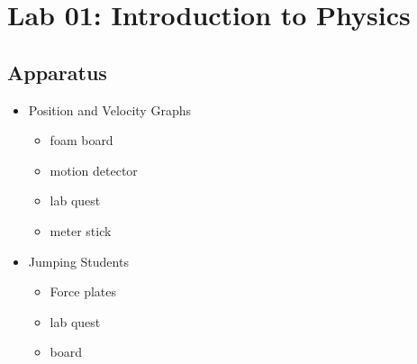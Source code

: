 

\usepackage{graphicx}
\graphicspath{ {./lab0images/} }


\renewcommand\assignment{Lab 0: Introduction to Physics, 1/24/2023, Partner: }

    \section*{Lab 01: Introduction to Physics}

    \subsection*{Apparatus}

    \begin{itemize}
        \item Position and Velocity Graphs
        \begin{itemize}
            \item foam board
            \item motion detector
            \item lab quest
            \item meter stick
        \end{itemize}
        \item Jumping Students
        \begin{itemize}
            \item Force plates
            \item lab quest
            \item board
        \end{itemize}
    \end{itemize}

